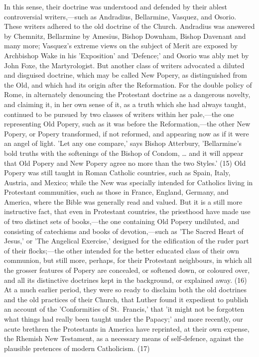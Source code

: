 \documentclass[
]{book}
\begin{document}
In this sense, their doctrine was understood and defended by their ablest controversial writers,---such as Andradius, Bellarmine, Vasquez, and Osorio. These writers adhered to the old doctrine of the Church. Andradius was answered by Chemnitz, Bellarmine by Amesius, Bishop Downham, Bishop Davenant and many more; Vasquez's extreme views on the subject of Merit are exposed by Archbishop Wake in his 'Exposition' and 'Defence;' and Osorio was ably met by John Foxe, the Martyrologist. But another class of writers advocated a diluted and disguised doctrine, which may be called New Popery, as distinguished from the Old, and which had its origin after the Reformation. For the double policy of Rome, in alternately denouncing the Protestant doctrine as a dangerous novelty, and claiming it, in her own sense of it, as a truth which she had always taught, continued to be pursued by two classes of writers within her pale,---the one representing Old Popery, such as it was before the Reformation,---the other New Popery, or Popery transformed, if not reformed, and appearing now as if it were an angel of light. 'Let any one compare,' says Bishop Atterbury, 'Bellarmine's bold truths with the softenings of the Bishop of Condom, \ldots{} and it will appear that Old Popery and New Popery agree no more than the two Styles.' (15) Old Popery was still taught in Roman Catholic countries, such as Spain, Italy, Austria, and Mexico; while the New was specially intended for Catholics living in Protestant communities, such as those in France, England, Germany, and America, where the Bible was generally read and valued. But it is a still more instructive fact, that even in Protestant countries, the priesthood have made use of two distinct sets of books,---the one containing Old Popery undiluted, and consisting of catechisms and books of devotion,---such as 'The Sacred Heart of Jesus,' or 'The Angelical Exercise,' designed for the edification of the ruder part of their flocks;---the other intended for the better educated class of their own communion, but still more, perhaps, for their Protestant neighbours, in which all the grosser features of Popery are concealed, or softened down, or coloured over, and all its distinctive doctrines kept in the background, or explained away. (16) At a much earlier period, they were so ready to disclaim both the old doctrines and the old practices of their Church, that Luther found it expedient to publish an account of the 'Conformities of St.~Francis,' that 'it might not be forgotten what things had really been taught under the Papacy;' and more recently, our acute brethren the Protestants in America have reprinted, at their own expense, the Rhemish New Testament, as a necessary means of self-defence, against the plausible pretences of modern Catholicism. (17)
\end{document}
